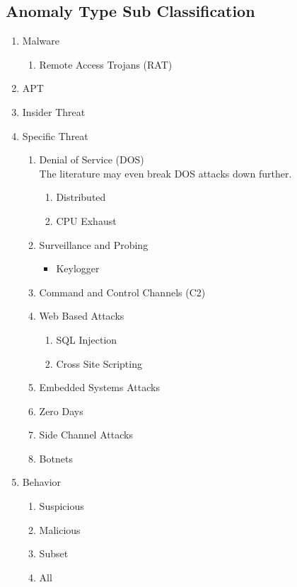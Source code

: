 \documentclass[10pt]{IEEEtran}
\begin{document}
\subsection{Anomaly Type Sub Classification}
\cite{hansman2005taxonomy} \cite{hansman2005taxonomy} 
\begin{enumerate}
    \item Malware\cite{gabriel2009analyzing}\cite{tankard2011advanced}
    \begin{enumerate}
        \item Remote Access Trojans (RAT)\cite{wu2017Anomaly Type}
    \end{enumerate}
    \item APT
    \item Insider Threat\cite{mukherjee1994network}
    \item Specific Threat
    \begin{enumerate}
        \item Denial of Service (DOS) \cite{zargar2013survey}\cite{warrender1999Anomaly Type}\cite{lee1999data}
        \\The literature may even break DOS attacks down further.
        \begin{enumerate} 
            \item Distributed
            \item CPU Exhaust
        \end{enumerate}
        \item Surveillance and Probing \cite{lazarevic2005intrusion}
        \begin{itemize}
            \item Keylogger
        \end{itemize}
        \item Command and Control Channels (C2) \cite{chen2014study}\cite{jasek2013apt}\cite{bhatt2014towards}
        \item Web Based Attacks
        \begin{enumerate}
            \item SQL Injection
            \item Cross Site Scripting
        \end{enumerate}
        \item Embedded Systems Attacks
        \item Zero Days \cite{kotenko2012common}\cite{chen2014study}\cite{jeun2012practical}
        \item Side Channel Attacks
        \item Botnets\cite{singh2014big}\cite{awad2017network}
    \end{enumerate}
    \item Behavior
        \begin{enumerate}
            \item Suspicious
            \item Malicious
            \item Subset
            \item All
        \end{enumerate}
\end{enumerate}
\end{document}
